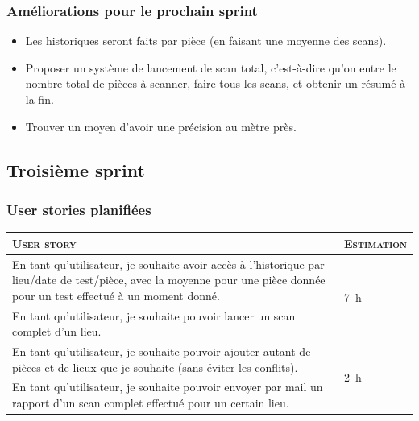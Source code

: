 \documentclass{elsarticle}
\newcommand{\est}[1]{\multirow{2}{*}{\SI{#1}{\hour}}}
\newcommand{\estbis}[1]{\SI{#1}{\hour}}
\begin{document}
\subsubsection{Améliorations pour le prochain sprint}
\begin{itemize}
	\item Les historiques seront faits par pièce (en faisant une moyenne des scans).
	\item Proposer un système de lancement de scan total,
	c’est-à-dire qu’on entre le nombre total de pièces à scanner, faire tous les scans, et obtenir un résumé à la fin.
	\item Trouver un moyen d'avoir une précision au mètre près.
\end{itemize}

\subsection{Troisième sprint}
\subsubsection{User stories planifiées}
\begin{table}[H]
	\centering
	\begin{tabular}{p{14cm}m{2cm}}
		\toprule
		\textsc{User story} & \textsc{Estimation}\\
		\midrule
		En tant qu'utilisateur, je souhaite avoir accès à l'historique par lieu/date de test/pièce, avec la moyenne pour une pièce donnée pour un test effectué à un moment donné. & \est{7}\\
		\midrule
		En tant qu'utilisateur, je souhaite pouvoir lancer un scan complet d'un lieu. & \estbis{5}\\
		\midrule
		En tant qu'utilisateur, je souhaite pouvoir ajouter autant de pièces et de lieux que je souhaite (sans éviter les conflits). & \est{2}\\
		\midrule
		En tant qu'utilisateur, je souhaite pouvoir envoyer par mail un rapport d'un scan complet effectué pour un certain lieu. & \est{8}\\
		\bottomrule
	\end{tabular}
\end{table}
\end{document}
